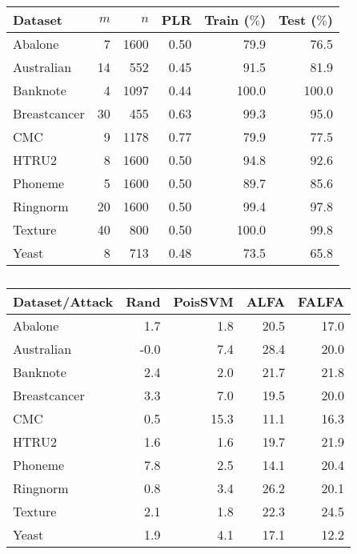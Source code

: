 \begin{table}
    \centering
    \scriptsize
    \caption{}
    \begin{tabular}{l|r|r|r|r|r}
        \hline
        Dataset         & $m$ & $n$ & PLR  & Train ($\%$) & Test ($\%$) \\ \hline\hline
        Abalone      & 7  & 1600 & 0.50 &  79.9 &  76.5 \\
        Australian   & 14 & 552  & 0.45 &  91.5 &  81.9 \\
        Banknote     & 4  & 1097 & 0.44 & 100.0 & 100.0 \\
        Breastcancer & 30 & 455  & 0.63 &  99.3 &  95.0 \\
        CMC          & 9  & 1178 & 0.77 &  79.9 &  77.5 \\
        HTRU2        & 8  & 1600 & 0.50 &  94.8 &  92.6 \\
        Phoneme      & 5  & 1600 & 0.50 &  89.7 &  85.6 \\
        Ringnorm     & 20 & 1600 & 0.50 &  99.4 &  97.8 \\
        Texture      & 40 & 800  & 0.50 & 100.0 &  99.8 \\
        Yeast        & 8  & 713  & 0.48 &  73.5 &  65.8 \\ \hline
    \end{tabular}
    \label{tab.datasets}
\end{table}

\begin{table}
    \centering
    \scriptsize
    \caption{}
    \begin{tabular}{l|r|r|r|r}
        \hline
        Dataset/Attack &  Rand &  PoisSVM &  ALFA &  FALFA \\ \hline \hline   
        Abalone &   1.7 &      1.8 &  20.5 &   17.0 \\
        Australian &  -0.0 &      7.4 &  28.4 &   20.0 \\
          Banknote &   2.4 &      2.0 &  21.7 &   21.8 \\
      Breastcancer &   3.3 &      7.0 &  19.5 &   20.0 \\
               CMC &   0.5 &     15.3 &  11.1 &   16.3 \\
             HTRU2 &   1.6 &      1.6 &  19.7 &   21.9 \\
           Phoneme &   7.8 &      2.5 &  14.1 &   20.4 \\
          Ringnorm &   0.8 &      3.4 &  26.2 &   20.1 \\
           Texture &   2.1 &      1.8 &  22.3 &   24.5 \\
             Yeast &   1.9 &      4.1 &  17.1 &   12.2 \\
        \hline
        \end{tabular}
    \label{tab.err}
\end{table}
